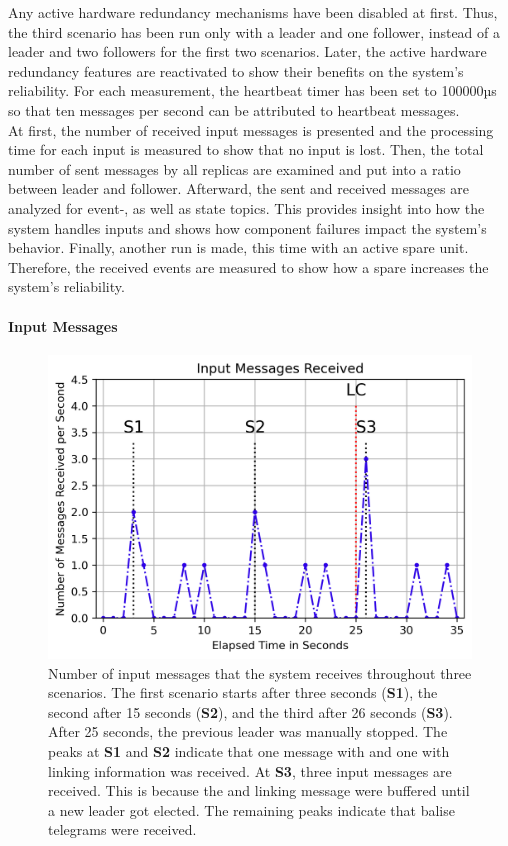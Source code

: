 Any active hardware redundancy mechanisms have been disabled at first.
Thus, the third scenario has been run only with a leader and one follower, instead of a leader and two followers for the first two scenarios.
Later, the active hardware redundancy features are reactivated to show their benefits on the system's reliability.
For each measurement, the heartbeat timer has been set to 100000µs so that ten messages per second can be attributed to heartbeat messages.
\\

At first, the number of received input messages is presented and the processing time for each input is measured to show that no input is lost.
Then, the total number of sent messages by all replicas are examined and put into a ratio between leader and follower.
Afterward, the sent and received messages are analyzed for event-, as well as state topics.
This provides insight into how the system handles inputs and shows how component failures impact the system's behavior.
Finally, another run is made, this time with an active spare unit.
Therefore, the received events are measured to show how a spare increases the system's reliability.

\paragraph{Input Messages}

\begin{figure}[!hb]
	\centering
	\includegraphics[width=0.8\linewidth]{images/plots/InputMessagesReceive}
	\caption{Number of input messages that the system receives throughout three scenarios. The first scenario starts after three seconds (\textbf{S1}), the second after 15 seconds (\textbf{S2}), and the third after 26 seconds (\textbf{S3}). After 25 seconds, the previous leader was manually stopped. The peaks at \textbf{S1} and \textbf{S2} indicate that one message with  and one with linking information was received. At \textbf{S3}, three input messages are received. This is because the  and linking message were buffered until a new leader got elected. The remaining peaks indicate that balise telegrams were received.}
	\label{fig:PlotInputMessagesReceive}
\end{figure}


